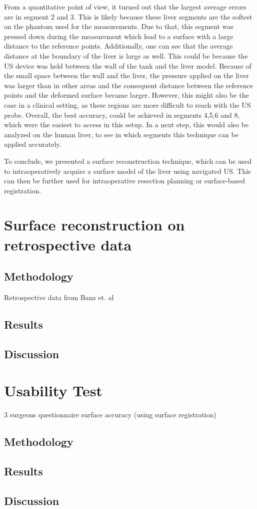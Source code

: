 From a quantitative point of view, it turned out that the largest average errors
are in segment 2 and 3. This is likely because these liver segments are the
softest on the phantom used for the measurements. Due to that, this segment was
pressed down during the measurement which lead to a surface with a large
distance to the reference points. Additionally, one can see that the average
distance at the boundary of the liver is large as well. This could be because
the US device was held between the wall of the tank and the liver model. Because
of the small space between the wall and the liver, the pressure applied on the
liver was larger than in other areas and the consequent distance between the
reference points and the deformed surface became larger. However, this might
also be the case in a clinical setting, as these regions are more difficult to
reach with the US probe. Overall, the best accuracy, could be achieved in
segments 4,5,6 and 8, which were the easiest to access in this setup. In a next
step, this would also be analyzed on the human liver, to see in which segments
this technique can be applied accurately.

To conclude, we presented a surface reconstruction technique, which can be used
to intraoperatively acquire a surface model of the liver using navigated US.
This can then be further used for intraoperative resection planning or
surface-based registration.


\section{Surface reconstruction on retrospective data}
\subsection{Methodology}
Retrospective data from Banz et. al
\subsection{Results}
\subsection{Discussion}

\section{Usability Test}
3 surgeons
questionnaire
surface accuracy (using surface registration)
\subsection{Methodology}
\subsection{Results}
\subsection{Discussion}
